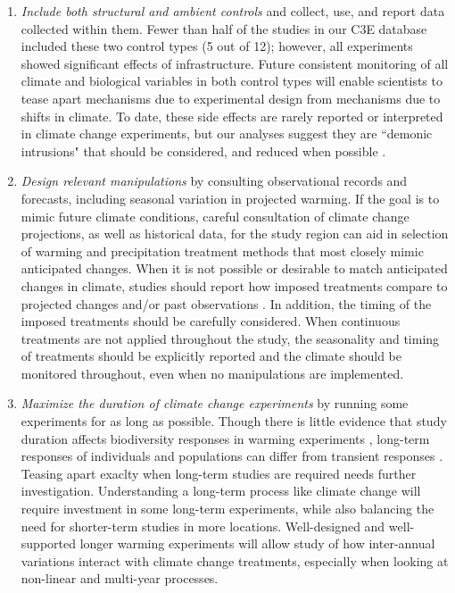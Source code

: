 \documentclass{article}
\begin{document}
\begin{enumerate}
\item\textit{Include both structural and ambient controls} and collect, use, and report data collected within them. Fewer than half of the studies in our C3E database included these two control types (5 out of 12); however, all experiments showed significant effects of infrastructure. Future consistent monitoring of all climate and biological variables in both control types will enable scientists to tease apart mechanisms due to experimental design from mechanisms due to shifts in climate. To date, these side effects are rarely reported or interpreted in climate change experiments, but our analyses suggest they are ``demonic intrusions" that should be considered, and reduced when possible \citep{hurlbert1984}. 
\item\textit{Design relevant manipulations} by consulting observational records and forecasts, including seasonal variation in projected warming. If the goal is to mimic future climate conditions, careful consultation of climate change projections, as well as historical data, for the study region can aid in selection of warming and precipitation treatment methods that most closely mimic anticipated changes. When it is not possible or desirable to match anticipated changes in climate, studies should report how imposed treatments compare to projected changes and/or past observations \citep[see, e.g.,][]{hoover2014}. In addition, the timing of the imposed treatments should be carefully considered. When continuous treatments are not applied throughout the study, the seasonality and timing of treatments should be explicitly reported and the climate should be monitored throughout, even when no manipulations are implemented.
\item\textit{Maximize the duration of climate change experiments} by running some experiments for as long as possible. Though there is little evidence that study duration affects biodiversity responses in warming experiments \citep{gruner2016}, long-term responses of individuals and populations can differ from transient responses \citep{saleska2002,franklin1989,giasson2013,harte2015}. Teasing apart exaclty when long-term studies are required needs further investigation. Understanding a long-term process like climate change will require investment in some long-term experiments, while also balancing the need for shorter-term studies in more locations. Well-designed and well-supported longer warming experiments will allow study of how inter-annual variations interact with climate change treatments, especially when looking at non-linear and multi-year processes. 

\end{enumerate}

\clearpage
\end{document}
